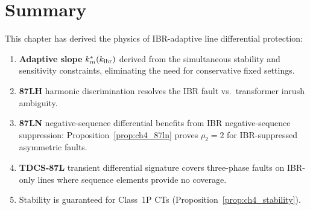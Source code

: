 \section{Summary}
\label{sec:ch4_summary}

This chapter has derived the physics of IBR-adaptive line differential
protection:
\begin{enumerate}
\item \textbf{Adaptive slope} $k_m^\ast(k_{\mathrm{ibr}})$ derived from the
      simultaneous stability and sensitivity constraints, eliminating
      the need for conservative fixed settings.
\item \textbf{87LH} harmonic discrimination resolves the IBR fault vs.\
      transformer inrush ambiguity.
\item \textbf{87LN} negative-sequence differential benefits from IBR
      negative-sequence suppression: Proposition~\ref{prop:ch4_87ln}
      proves $\rho_2 = 2$ for IBR-suppressed asymmetric faults.
\item \textbf{TDCS-87L} transient differential signature covers three-phase
      faults on IBR-only lines where sequence elements provide no coverage.
\item Stability is guaranteed for Class~1P CTs (Proposition~\ref{prop:ch4_stability}).
\end{enumerate}
